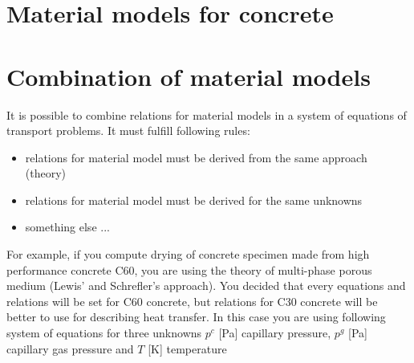 \section{Material models for concrete}


\section{Combination of material models}

It is possible to combine relations for material models in a system of equations of transport problems.
It must fulfill following rules:
\begin{itemize}
\item{relations for material model must be derived from the same approach (theory)}
\item{relations for material model must be derived for the same unknowns}
\item{something else ...}
\end{itemize}
For example, if you compute drying of concrete specimen made from high performance concrete C60, 
you are using the theory of multi-phase porous medium (Lewis' and Schrefler's approach). 
You decided that every equations and relations will be set for C60 concrete, 
but relations for C30 concrete will be better to use for describing heat transfer.
In this case you are using following system of equations for three unknowns 
$p^c$ [Pa] capillary pressure, $p^g$ [Pa] capillary gas pressure and $T$ [K] temperature

